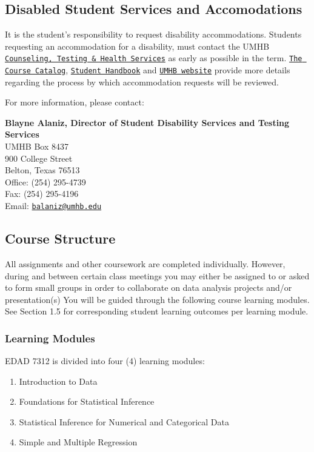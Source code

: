\documentclass[
]{article}
\providecommand{\tightlist}{%
  \setlength{\itemsep}{0pt}\setlength{\parskip}{0pt}}
\begin{document}
\subsection{Disabled Student Services and Accomodations}

It is the student's responsibility to request disability accommodations.
Students requesting an accommodation for a disability, must contact the
UMHB
\href{http://cths.umhb.edu/disability}{\texttt{Counseling, Testing \& Health Services}}
as early as possible in the term.
\href{http://catalog.umhb.edu/en/2019-2020/Graduate-Catalog}{\texttt{The Course Catalog}},
\href{http://students.umhb.edu/student-handbook}{\texttt{Student Handbook}}
and \href{https://go.umhb.edu/}{\texttt{UMHB website}} provide more
details regarding the process by which accommodation requests will be
reviewed.

For more information, please contact:

\textbf{Blayne Alaniz, Director of Student Disability Services and
Testing Services}\\
UMHB Box 8437\\
900 College Street\\
Belton, Texas 76513\\
Office: (254) 295-4739\\
Fax: (254) 295-4196\\
Email: \texttt{\href{mailto:balaniz@umhb.edu}{balaniz@umhb.edu}}

\subsection{Course Structure}

All assignments and other coursework are completed individually.
However, during and between certain class meetings you may either be
assigned to or asked to form small groups in order to collaborate on
data analysis projects and/or presentation(s) You will be guided through
the following course learning modules. See Section 1.5 for corresponding
student learning outcomes per learning module.

\subsubsection{Learning Modules}

EDAD 7312 is divided into four (4) learning modules:

\begin{enumerate}
\def\labelenumi{\arabic{enumi}.}
\tightlist
\item
  Introduction to Data
\item
  Foundations for Statistical Inference
\item
  Statistical Inference for Numerical and Categorical Data
\item
  Simple and Multiple Regression
\end{enumerate}
\end{document}
